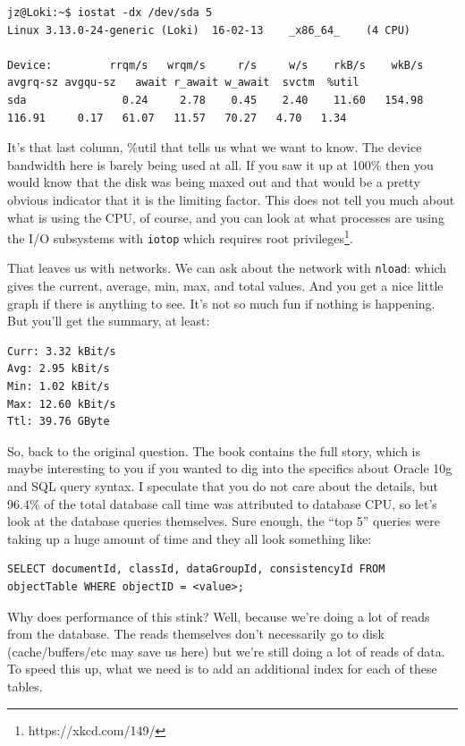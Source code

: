 \documentclass[a4paper]{report}
\begin{document}
{\scriptsize
\begin{verbatim}
jz@Loki:~$ iostat -dx /dev/sda 5 
Linux 3.13.0-24-generic (Loki) 	16-02-13 	_x86_64_	(4 CPU)

Device:         rrqm/s   wrqm/s     r/s     w/s    rkB/s    wkB/s avgrq-sz avgqu-sz   await r_await w_await  svctm  %util
sda               0.24     2.78    0.45    2.40    11.60   154.98   116.91     0.17   61.07   11.57   70.27   4.70   1.34
\end{verbatim}
}

It's that last column, \%util that tells us what we want to know. The device bandwidth here is barely being used at all. If you saw it up at 100\% then you would know that the disk was being maxed out and that would be a pretty obvious indicator that it is the limiting factor. This does not tell you much about what is using the CPU, of course, and you can look at what processes are using the I/O subsystems with \texttt{iotop} which requires root privileges\footnote{https://xkcd.com/149/}.

That leaves us with networks. We can ask about the network with \texttt{nload}: which gives the current, average, min, max, and total values. And you get a nice little graph if there is anything to see. It's not so much fun if nothing is happening. But you'll get the summary, at least:

\begin{verbatim}
Curr: 3.32 kBit/s
Avg: 2.95 kBit/s
Min: 1.02 kBit/s
Max: 12.60 kBit/s
Ttl: 39.76 GByte                                                                                       \end{verbatim}


So, back to the original question. The book contains the full story, which is maybe interesting to you if you wanted to dig into the specifics about Oracle 10g and SQL query syntax. I speculate that you do not care about the details, but 96.4\% of the total database call time was attributed to database CPU, so let's look at the database queries themselves. Sure enough, the ``top 5'' queries were taking up a huge amount of time and they all look something like:

\begin{verbatim}
SELECT documentId, classId, dataGroupId, consistencyId FROM objectTable WHERE objectID = <value>;
\end{verbatim}

Why does performance of this stink? Well, because we're doing a lot of reads from the database. The reads themselves don't necessarily go to disk (cache/buffers/etc may save us here) but we're still doing a lot of reads of data. To speed this up, what we need is to add an additional index for each of these tables. 
\end{document}
